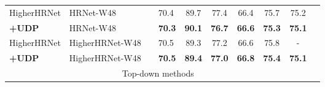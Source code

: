 \documentclass[10pt,journal,compsoc]{IEEEtran}
\begin{document}
\begin{table*}
\begin{center}
\begin{tabular}{l|l|c|lcccccc}
HigherHRNet \cite{Higher}&HRNet-W48     &    &70.4                  & 89.7              & 77.4           & 66.4          &75.7           &75.2\\
\textbf{+UDP}                    &HRNet-W48      &    &\textbf{70.3}         & \textbf{90.1}     & \textbf{76.7}  & \textbf{66.6} &\textbf{75.3}  &\textbf{75.1}\\
HigherHRNet \cite{Higher}        &HigherHRNet-W48&    &70.5                  & 89.3              & 77.2           & 66.6          &75.8           &-\\
\textbf{+UDP}                    &HigherHRNet-W48&    &\textbf{70.5}         & \textbf{89.4}     & \textbf{77.0}  & \textbf{66.8} &\textbf{75.4}  &\textbf{75.1}\\
\hline
\multicolumn{9}{c}{Top-down methods}\\


\end{tabular}
\end{center}
\end{table*}
\end{document}
